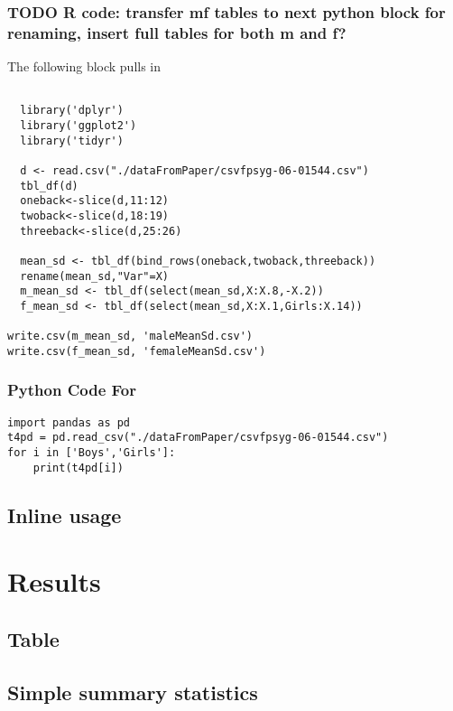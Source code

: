 \documentclass{article}
\begin{document}
\subsubsection{{\bfseries\sffamily TODO} R code: transfer mf tables to next python block for renaming, insert full tables for both m and f?}
\label{sec:org086fc08}
The following block pulls in 
\begin{verbatim}

  library('dplyr')
  library('ggplot2')
  library('tidyr')

  d <- read.csv("./dataFromPaper/csvfpsyg-06-01544.csv")
  tbl_df(d)
  oneback<-slice(d,11:12)
  twoback<-slice(d,18:19)
  threeback<-slice(d,25:26)

  mean_sd <- tbl_df(bind_rows(oneback,twoback,threeback))
  rename(mean_sd,"Var"=X)
  m_mean_sd <- tbl_df(select(mean_sd,X:X.8,-X.2))
  f_mean_sd <- tbl_df(select(mean_sd,X:X.1,Girls:X.14))

write.csv(m_mean_sd, 'maleMeanSd.csv')
write.csv(f_mean_sd, 'femaleMeanSd.csv')

\end{verbatim}




\subsubsection{Python Code For}
\label{sec:org69be266}
\begin{verbatim}
import pandas as pd
t4pd = pd.read_csv("./dataFromPaper/csvfpsyg-06-01544.csv")
for i in ['Boys','Girls']:
    print(t4pd[i])
\end{verbatim}

\subsection{Inline usage}
\label{sec:orgaef707c}

\section{Results}
\label{sec:orgf442622}
\subsection{Table}
\label{sec:orgfa1b9ee}
\subsection{Simple summary statistics}
\label{sec:org59c782b}
\end{document}
